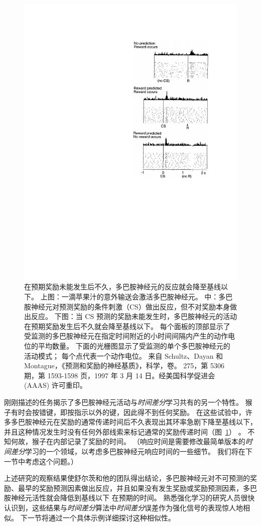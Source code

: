 \begin{figure}[!htb]
	\centering
	\includegraphics[width=0.5\linewidth]{chap12/fig_12_4}
	\caption{在预期奖励未能发生后不久，多巴胺神经元的反应就会降至基线以下。
		上图：一滴苹果汁的意外输送会激活多巴胺神经元。
		中：多巴胺神经元对预测奖励的条件刺激（CS）做出反应，但不对奖励本身做出反应。
		下图：当 CS 预测的奖励未能发生时，多巴胺神经元的活动在预期奖励发生后不久就会降至基线以下。
		每个面板的顶部显示了受监测的多巴胺神经元在指定时间附近的小时间间隔内产生的动作电位的平均数量。
		下面的光栅图显示了受监测的单个多巴胺神经元的活动模式；
		每个点代表一个动作电位。
		来自 Schultz、Dayan 和 Montague，《预测和奖励的神经基质》，科学，卷。 275，第 5306 期，第 1593-1598 页，1997 年 3 月 14 日。经美国科学促进会 (AAAS) 许可重印。
		\label{fig:12_4}}
\end{figure}


刚刚描述的任务揭示了多巴胺神经元活动与\textit{时间差分}学习共有的另一个特性。
猴子有时会按错键，即按指示以外的键，因此得不到任何奖励。
在这些试验中，许多多巴胺神经元在奖励的通常传递时间后不久表现出其环率急剧下降至基线以下，并且这种情况发生时没有任何外部线索来标记通常的奖励传递时间（图~\ref{fig:12_4}） 。
不知何故，猴子在内部记录了奖励的时间。
（响应时间是需要修改最简单版本的\textit{时间差分}学习的一个领域，以考虑多巴胺神经元响应时间的一些细节。
我们将在下一节中考虑这个问题。）


上述研究的观察结果使舒尔茨和他的团队得出结论，多巴胺神经元对不可预测的奖励、最早的奖励预测因素做出反应，并且如果没有发生奖励或奖励预测因素，多巴胺神经元活性就会降低到基线以下 在预期的时间。
熟悉强化学习的研究人员很快认识到，这些结果与\textit{时间差分}算法中\textit{时间差分}误差作为强化信号的表现惊人地相似。
下一节将通过一个具体示例详细探讨这种相似性。


